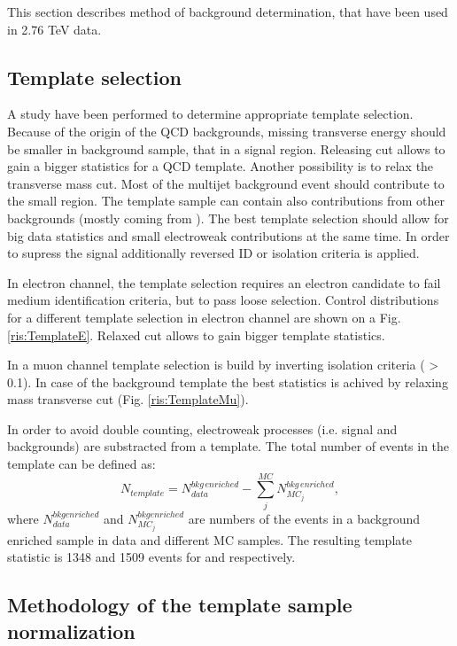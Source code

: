 This section describes method of \qcd background determination, that have been used in 2.76 TeV data. 

\subsection{Template selection}

A study have been performed to determine appropriate template selection. Because of the origin of the QCD backgrounds, missing transverse energy \etmiss should be smaller in background sample, that in a signal region. Releasing \etmiss cut allows to gain a bigger statistics for a QCD template. Another possibility is to relax the transverse mass \mtw cut. Most of the multijet background event should contribute to the small \mtw region. The template sample can contain also contributions from other backgrounds (mostly coming from \wlnu). The best template selection should allow for big data statistics and small electroweak contributions at the same time. In order to supress the signal additionally reversed ID or isolation criteria is applied. 

In electron channel, the template selection requires an electron candidate to fail medium identification criteria, but to pass loose selection. Control distributions for a different template selection in electron channel are shown on a Fig. \ref{ris:TemplateE}. Relaxed \etmiss cut allows to gain bigger template statistics. 

In a muon channel template selection is build by inverting isolation criteria ( \ptcone > 0.1). In case of \wmunu the \qcd background template the best statistics is achived by relaxing mass transverse \mtw cut (Fig. \ref{ris:TemplateMu}). 

In order to avoid double counting, electroweak processes (i.e. signal and backgrounds) are substracted from a template. The total number of events in the template can be defined as:
\begin{equation}
N_{template} = N^{bkg\, enriched}_{data} - \sum_{j}^{MC} N_{MC_j}^{bkg\, enriched},
\end{equation}
where $N^{bkg enriched}_{data}$ and $N_{MC_j}^{bkg enriched}$ are numbers of the events in a background enriched sample in data and different MC samples. The resulting template statistic is 1348 and 1509 events for \wenu and \wmunu respectively. 


\subsection{Methodology of the template sample normalization}

